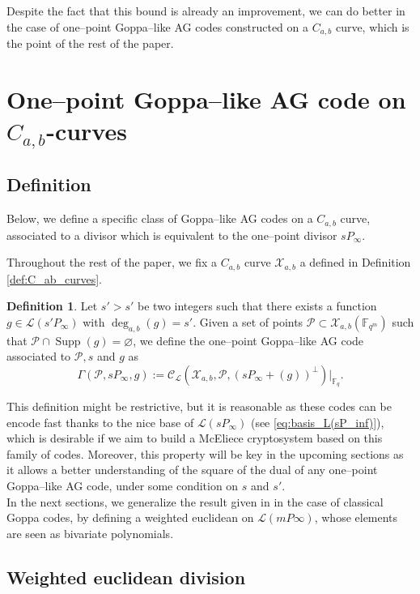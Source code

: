 \documentclass[a4paper]{article}
\theoremstyle{definition}
\newtheorem{definition}[thm]{Definition}
\theoremstyle{remark}
\newcommand{\calP}{\mathcal{P}}
\newcommand{\calL}{\mathcal{L}}
\newcommand{\calC}{\mathcal{C}}
\newcommand{\calX}{\mathcal{X}}
\newcommand{\fq}{\mathbb{F}_{q}}
\newcommand{\F}{\mathbb{F}}
\newcommand{\Supp}{\operatorname{Supp}}
\newcommand{\degab}[1]{\deg_{a,b}\left(#1\right)}
\begin{document}
Despite the fact that this bound is already an improvement, we can do better in the case of one--point Goppa--like AG codes constructed on a $C_{a,b}$ curve, which is the point of the rest of the paper.

\section{One--point Goppa--like AG code on $C_{a,b}$-curves}

\subsection{Definition}


Below, we define a specific class of Goppa--like AG codes on a $C_{a,b}$ curve, associated to a divisor which is equivalent to the one--point divisor $sP_\infty$. 

\noindent Throughout the rest of the paper, we fix a $C_{a,b}$ curve $\calX_{a,b}$ a defined in Definition \ref{def:C_ab_curves}.

\begin{definition} \label{def:one--point_Goppa--like_AG_codes_on_C_a,b_curves}
Let $s'>s'$ be two integers such that there exists a function $g \in \calL(s'P_\infty)$ with $\degab{g}=s'$. Given a set of points  $\calP \subset \calX_{a,b}(\F_{q^m})$ such that $\calP \cap \Supp(g) = \varnothing$, we define the one--point Goppa--like AG code associated to $\calP,s$ and $g$ as 
\[\Gamma(\calP,sP_\infty,g) := \calC_{\calL}(\calX_{a,b},\calP,(sP_\infty+(g))^{\perp})|_{\fq}.\]
\end{definition}

This definition might be restrictive, but it is reasonable as these codes can be encode fast thanks to the nice base of $\calL(sP_\infty)$ (see \eqref{eq:basis_L(sP_inf)}), which is desirable if we aim to build a McEliece cryptosystem based on this family of codes. Moreover, this property will be key in the upcoming sections as it allows a better understanding of the square of the dual of any one--point Goppa--like AG code, under some condition on $s$ and $s'$. \\


\noindent In the next sections, we generalize the result given in \cite{MT21} in the case of classical Goppa codes, by defining a weighted euclidean on $\calL(mP\infty)$, whose elements are seen as bivariate polynomials. 

\subsection{Weighted euclidean division}
\end{document}
